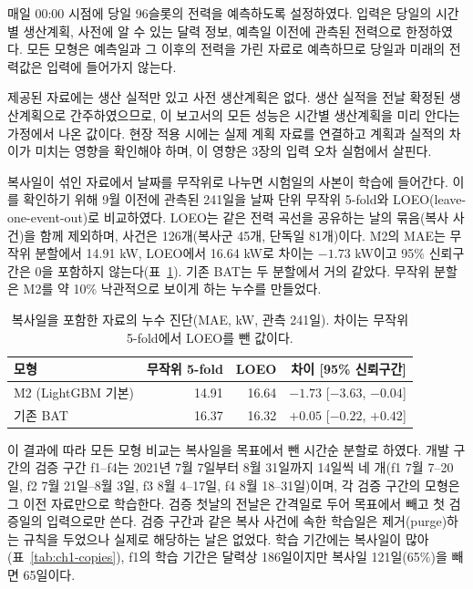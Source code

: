 
매일 00:00 시점에 당일 96슬롯의 전력을 예측하도록 설정하였다. 입력은 당일의 시간별 생산계획, 사전에 알 수 있는 달력 정보, 예측일 이전에 관측된 전력으로 한정하였다. 모든 모형은 예측일과 그 이후의 전력을 가린 자료로 예측하므로 당일과 미래의 전력값은 입력에 들어가지 않는다.

제공된 자료에는 생산 실적만 있고 사전 생산계획은 없다. 생산 실적을 전날 확정된 생산계획으로 간주하였으므로, 이 보고서의 모든 성능은 시간별 생산계획을 미리 안다는 가정에서 나온 값이다. 현장 적용 시에는 실제 계획 자료를 연결하고 계획과 실적의 차이가 미치는 영향을 확인해야 하며, 이 영향은 3장의 입력 오차 실험에서 살핀다.

복사일이 섞인 자료에서 날짜를 무작위로 나누면 시험일의 사본이 학습에 들어간다. 이를 확인하기 위해 9월 이전에 관측된 241일을 날짜 단위 무작위 5-fold와 LOEO(leave-one-event-out)로 비교하였다. LOEO는 같은 전력 곡선을 공유하는 날의 묶음(복사 사건)을 함께 제외하며, 사건은 126개(복사군 45개, 단독일 81개)이다. M2의 MAE는 무작위 분할에서 14.91 kW, LOEO에서 16.64 kW로 차이는 $-1.73$ kW이고 95\% 신뢰구간은 0을 포함하지 않는다(표~\ref{tab:ch1-leak}). 기존 BAT는 두 분할에서 거의 같았다. 무작위 분할은 M2를 약 10\% 낙관적으로 보이게 하는 누수를 만들었다.

\begin{table}[htbp]
\centering
\hwptablefont
\caption{복사일을 포함한 자료의 누수 진단(MAE, kW, 관측 241일). 차이는 무작위 5-fold에서 LOEO를 뺀 값이다.}\label{tab:ch1-leak}
\begin{tabular}{lrrr}
\toprule
모형 & 무작위 5-fold & LOEO & 차이 [95\% 신뢰구간] \\
\midrule
M2 (LightGBM 기본) & 14.91 & 16.64 & $-1.73$ [$-3.63$, $-0.04$] \\
기존 BAT & 16.37 & 16.32 & $+0.05$ [$-0.22$, $+0.42$] \\
\bottomrule
\end{tabular}
\end{table}

이 결과에 따라 모든 모형 비교는 복사일을 목표에서 뺀 시간순 분할로 하였다. 개발 구간의 검증 구간 f1--f4는 2021년 7월 7일부터 8월 31일까지 14일씩 네 개(f1 7월 7--20일, f2 7월 21일--8월 3일, f3 8월 4--17일, f4 8월 18--31일)이며, 각 검증 구간의 모형은 그 이전 자료만으로 학습한다. 검증 첫날의 전날은 간격일로 두어 목표에서 빼고 첫 검증일의 입력으로만 쓴다. 검증 구간과 같은 복사 사건에 속한 학습일은 제거(purge)하는 규칙을 두었으나 실제로 해당하는 날은 없었다. 학습 기간에는 복사일이 많아(표~\ref{tab:ch1-copies}), f1의 학습 기간은 달력상 186일이지만 복사일 121일(65\%)을 빼면 65일이다.

